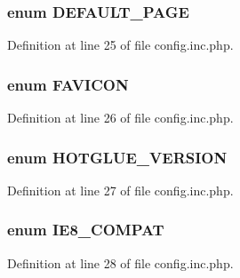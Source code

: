 \hypertarget{config_8inc_8php_a4208e17d37801abf0982b2d1e625a8f2}{
\subsubsection[{DEFAULT\_\-PAGE}]{\setlength{\rightskip}{0pt plus 5cm}enum {\bf DEFAULT\_\-PAGE}}}
\label{config_8inc_8php_a4208e17d37801abf0982b2d1e625a8f2}


Definition at line 25 of file config.inc.php.

\hypertarget{config_8inc_8php_afd55d95ee6651060397404533516882a}{
\subsubsection[{FAVICON}]{\setlength{\rightskip}{0pt plus 5cm}enum {\bf FAVICON}}}
\label{config_8inc_8php_afd55d95ee6651060397404533516882a}


Definition at line 26 of file config.inc.php.

\hypertarget{config_8inc_8php_a7c35565a4692ae46fd1c04340f4f1ca9}{
\subsubsection[{HOTGLUE\_\-VERSION}]{\setlength{\rightskip}{0pt plus 5cm}enum {\bf HOTGLUE\_\-VERSION}}}
\label{config_8inc_8php_a7c35565a4692ae46fd1c04340f4f1ca9}


Definition at line 27 of file config.inc.php.

\hypertarget{config_8inc_8php_a1d76a949b348522c90864da5df468d51}{
\subsubsection[{IE8\_\-COMPAT}]{\setlength{\rightskip}{0pt plus 5cm}enum {\bf IE8\_\-COMPAT}}}
\label{config_8inc_8php_a1d76a949b348522c90864da5df468d51}


Definition at line 28 of file config.inc.php.

